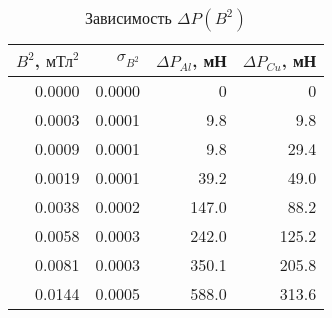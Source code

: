 \begin{table} 
\begin{center}
 \caption{Зависимость $\Delta P(B^2)$}
\begin{tabular}{|*{4}{r|}}
\hline 
$B^2$, $\text{мТл}^2$ & $\sigma_{B^2}$ & $\Delta P_{Al}$, мН & $\Delta P_{Cu}$, мН\\ \hline 
0.0000 & 0.0000 & 0 & 0 \\ \hline 
 0.0003 & 0.0001 & 9.8 & 9.8 \\ \hline 
 0.0009 & 0.0001 & 9.8 & 29.4 \\ \hline 
 0.0019 & 0.0001 & 39.2 & 49.0 \\ \hline 
 0.0038 & 0.0002 & 147.0 & 88.2 \\ \hline 
 0.0058 & 0.0003 & 242.0 & 125.2 \\ \hline 
 0.0081 & 0.0003 & 350.1 & 205.8 \\ \hline 
 0.0144 & 0.0005 & 588.0 & 313.6 \\ \hline 
 \end{tabular}
 \end{center} 
\end{table} 
